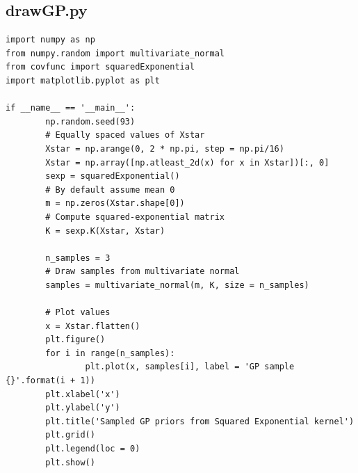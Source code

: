 \documentclass[10pt,a4paper,twoside]{book}
\begin{document}
\subsection*{drawGP.py}
\label{drawGP}
\begin{verbatim}
import numpy as np
from numpy.random import multivariate_normal
from covfunc import squaredExponential
import matplotlib.pyplot as plt

if __name__ == '__main__':
        np.random.seed(93)
        # Equally spaced values of Xstar
        Xstar = np.arange(0, 2 * np.pi, step = np.pi/16)
        Xstar = np.array([np.atleast_2d(x) for x in Xstar])[:, 0]
        sexp = squaredExponential()
        # By default assume mean 0
        m = np.zeros(Xstar.shape[0])
        # Compute squared-exponential matrix
        K = sexp.K(Xstar, Xstar)

        n_samples = 3
        # Draw samples from multivariate normal
        samples = multivariate_normal(m, K, size = n_samples)

        # Plot values
        x = Xstar.flatten()
        plt.figure()
        for i in range(n_samples):
                plt.plot(x, samples[i], label = 'GP sample {}'.format(i + 1))
        plt.xlabel('x')
        plt.ylabel('y')
        plt.title('Sampled GP priors from Squared Exponential kernel')
        plt.grid()
        plt.legend(loc = 0)
        plt.show()	
\end{verbatim}
\end{document}
